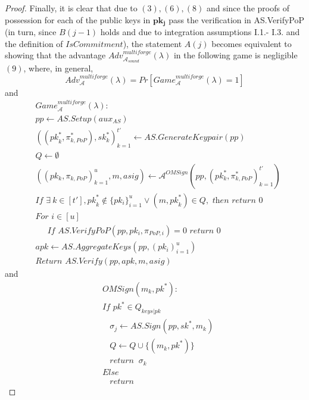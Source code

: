 \begin{proof}
\noindent Finally, it is clear that due to $(3), (6), (8)$ and since the proofs of possession for each of the public 
keys in $\mathbf{pk_j}$ pass the verification in AS.VerifyPoP (in turn, since $B(j-1)$ holds and due to integration assumptions 
I.1.- I.3. and the definition of $\mathit{IsCommitment}$), the statement $A(j)$ 
becomes equivalent to showing that the advantage
$\mathit{Adv}^{\mathit{multiforge}}_{\mathcal{A}_{\mathit{sound}}}({\lambda})$ in the following game is negligible $(9)$,
where, in general, 
$$\mathit{Adv}^{\mathit{multiforge}}_{\mathcal{A}}({\lambda}) = \mathit{Pr}[\mathit{Game}^{\mathit{multiforge}}_{\mathcal{A}}({\lambda}) =1]$$
\noindent and 
\begin{align*}
&\mathit{Game}^{\mathit{multiforge}}_{\mathcal{A}}({\lambda}): \\
& \mathit{pp} \leftarrow \mathit{AS.Setup}(\mathit{aux_{\mathit{AS}}}) \\
& ((\mathit{pk}_{k}^*,\pi^*_{k, \mathit{PoP}}), \mathit{sk}_{k}^*)_{k=1}^{t'} \leftarrow \mathit{AS.GenerateKeypair}(\mathit{pp})\\
& Q \leftarrow \emptyset \ \\
& ((\mathit{pk_k}, \pi_{k,\mathit{PoP}})_{k=1}^{u}, m, \mathit{asig}) \leftarrow \mathcal{A}^{\mathit{OMSign}}(\mathit{pp}, (\mathit{pk_k^*},\pi^*_{k,\mathit{PoP}})_{k=1}^{t'}) \\
& \textit{If } \exists \ k \in [t'], \mathit{pk}_{k}^*  \notin \{ \mathit{pk_i} \}_{i=1}^{u}  \vee (m, \mathit{pk}^*_{k}) \in Q, \textit{ then return } 0 \\
& \textit{For } i \in [u] \\
& \ \ \ \ \ \textit{ If } \mathit{AS.VerifyPoP}(\mathit{pp}, \mathit{pk_i}, \pi_{\mathit{PoP},i})=0  \textit{ return } 0 \\
& \mathit{apk} \leftarrow \mathit{AS.AggregateKeys}(\mathit{pp}, (\mathit{pk_i})_{i=1}^{u}) \\
& \textit{Return } \mathit{AS.Verify}(\mathit{pp}, \mathit{apk}, m, \mathit{asig})
\end{align*}
\noindent and
\begin{align*}
& \mathit{OMSign}(m_k, \mathit{pk}^*): \\
& \textit{If } \mathit{pk}^* \in Q_{\mathit{keys}|\mathit{pk}} \\
& \ \ \ \ \sigma_j \leftarrow \mathit{AS.Sign}(\mathit{pp}, \mathit{sk}^*, m_k) \\
& \ \ \ \  Q \leftarrow Q \cup \{(m_k,  \mathit{pk}^*) \} \\
& \ \ \ \ \textit{return } \ \sigma_k \\
& Else \\
& \ \ \ \ \textit{return}
\end{align*}


\end{proof}
